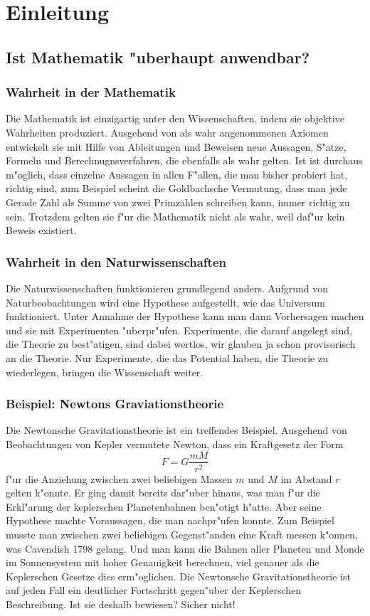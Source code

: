 %
%
\chapter*{Einleitung}
\section*{Ist Mathematik "uberhaupt anwendbar?}
\subsection*{Wahrheit in der Mathematik}
Die Mathematik ist einzigartig unter den Wissenschaften, indem
sie objektive Wahrheiten produziert.
Ausgehend von als wahr angenommenen Axiomen entwickelt sie mit 
Hilfe von Ableitungen und Beweisen neue Aussagen, S"atze, Formeln
und Berechnugnsverfahren, die ebenfalls als wahr gelten.
Ist ist durchaus m"oglich, dass einzelne Aussagen in allen
F"allen, die man bisher probiert hat, richtig sind, zum Beispiel
scheint die Goldbachsche Vermutung, dass man jede Gerade Zahl als
Summe von zwei Primzahlen schreiben kann, immer richtig zu sein.
Trotzdem gelten sie f"ur die Mathematik nicht als wahr, weil
daf"ur kein Beweis existiert.

\subsection*{Wahrheit in den Naturwissenschaften}
Die Naturwissenschaften funktionieren grundlegend anders.
Aufgrund von Naturbeobachtungen wird eine Hypothese aufgestellt,
wie das Universum funktioniert.
Unter Annahme der Hypothese kann man dann Vorhersagen machen
und sie mit Experimenten "uberpr"ufen. 
Experimente, die darauf angelegt sind, die Theorie zu best"atigen,
sind dabei wertlos,
wir glauben ja schon provisorisch an die Theorie.
Nur Experimente, die das Potential haben, die Theorie zu
wiederlegen, bringen die Wissenschaft weiter.

\subsection*{Beispiel: Newtons Graviationstheorie}
Die Newtonsche Gravitationstheorie ist ein treffendes Beispiel.
Ausgehend von Beobachtungen von Kepler vermutete Newton, dass
ein Kraftgesetz der Form
\[
F=G\frac{mM}{r^2}
\]
f"ur die Anziehung zwischen zwei beliebigen Massen $m$ und $M$ im Abstand $r$
gelten k"onnte.
Er ging damit bereits dar"uber hinaus, was man f"ur die Erkl"arung der
keplerschen Planetenbahnen ben"otigt h"atte.
Aber seine Hypothese machte Voraussagen, die man nachpr"ufen konnte.
Zum Beispiel musste man zwischen zwei beliebigen Gegenst"anden eine
Kraft messen k"onnen, was Cavendish 1798 gelang.
Und man kann die Bahnen aller Planeten und Monde im
Sonnensystem mit hoher Genauigkeit berechnen, viel genauer als die
Keplerschen Gesetze dies erm"oglichen.
Die Newtonsche Gravitationstheorie ist auf jeden Fall ein deutlicher
Fortschritt gegen"uber der Keplerschen Beschreibung.
Ist sie deshalb bewiesen? Sicher nicht!

